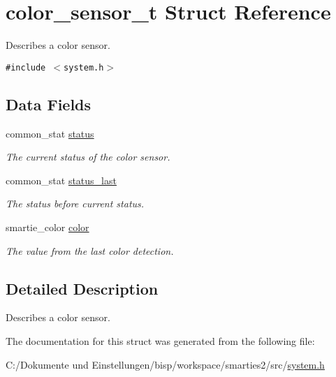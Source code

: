 \hypertarget{structcolor__sensor__t}{
\section{color\_\-sensor\_\-t Struct Reference}
\label{structcolor__sensor__t}
}
Describes a color sensor.  


{\tt \#include $<$system.h$>$}

\subsection*{Data Fields}
\begin{CompactItemize}
\item 
\hypertarget{structcolor__sensor__t_7c408b0499af3eee658a73974a472db1}{
common\_\-stat \hyperlink{structcolor__sensor__t_7c408b0499af3eee658a73974a472db1}{status}}
\label{structcolor__sensor__t_7c408b0499af3eee658a73974a472db1}

\begin{CompactList}\small\item\em The current status of the color sensor. \item\end{CompactList}\item 
\hypertarget{structcolor__sensor__t_b370a30c4bb90b0793b6bdfeb49e8589}{
common\_\-stat \hyperlink{structcolor__sensor__t_b370a30c4bb90b0793b6bdfeb49e8589}{status\_\-last}}
\label{structcolor__sensor__t_b370a30c4bb90b0793b6bdfeb49e8589}

\begin{CompactList}\small\item\em The status before current status. \item\end{CompactList}\item 
\hypertarget{structcolor__sensor__t_45bcb085af6b67cd98d63799f1bcc449}{
smartie\_\-color \hyperlink{structcolor__sensor__t_45bcb085af6b67cd98d63799f1bcc449}{color}}
\label{structcolor__sensor__t_45bcb085af6b67cd98d63799f1bcc449}

\begin{CompactList}\small\item\em The value from the last color detection. \item\end{CompactList}\end{CompactItemize}


\subsection{Detailed Description}
Describes a color sensor. 

The documentation for this struct was generated from the following file:\begin{CompactItemize}
\item 
C:/Dokumente und Einstellungen/bisp/workspace/smarties2/src/\hyperlink{system_8h}{system.h}\end{CompactItemize}
